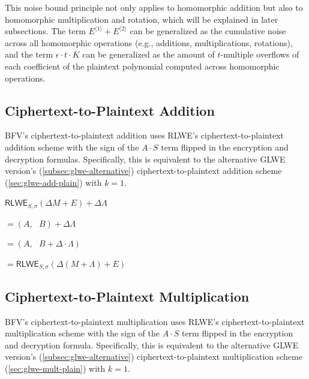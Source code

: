 This noise bound principle not only applies to homomorphic addition but also to homomorphic multiplication and rotation, which will be explained in later subsections. The term $E^{\langle 1 \rangle} + E^{\langle 2 \rangle}$ can be generalized as the cumulative noise across all homomorphic operations (e.g., additions, multiplications, rotations), and the term $\epsilon \cdot t\cdot K$ can be generalized as the amount of $t$-multiple overflows of each coefficient of the plaintext polynomial computed across homomorphic operations.



\subsection{Ciphertext-to-Plaintext Addition}
\label{subsec:bfv-add-plain}

BFV's ciphertext-to-plaintext addition uses RLWE's ciphertext-to-plaintext addition scheme with the sign of the $A\cdot S$ term flipped in the encryption and decryption formulas. Specifically, this is equivalent to the alternative GLWE version's (\autoref{subsec:glwe-alternative}) ciphertext-to-plaintext addition scheme (\autoref{sec:glwe-add-plain}) with $k = 1$.  


\begin{tcolorbox}[title={\textbf{\tboxlabel{\ref*{subsec:bfv-add-plain}} BFV Ciphertext-to-Plaintext Addition}}]
$\textsf{RLWE}_{S, \sigma}(\Delta M + E) + \Delta\Lambda $

$=  (A, \text{ } B) + \Delta\Lambda$

$=  (A, \text{ } B + \Delta\cdot\Lambda)$

$= \textsf{RLWE}_{S, \sigma}(\Delta (M + \Lambda) + E)$
\end{tcolorbox}



\subsection{Ciphertext-to-Plaintext Multiplication}
\label{subsec:bfv-mult-plain}


BFV's ciphertext-to-plaintext multiplication uses RLWE's ciphertext-to-plaintext multiplication scheme with the sign of the $A\cdot S$ term flipped in the encryption and decryption formula. Specifically, this is equivalent to the alternative GLWE version's (\autoref{subsec:glwe-alternative}) ciphertext-to-plaintext multiplication scheme (\autoref{sec:glwe-mult-plain}) with $k = 1$.   


